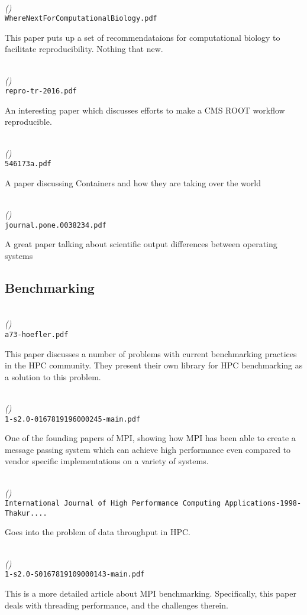 \documentclass{article}
\newenvironment{refdef}[2] {
	\noindent \textbf{\citetitle{#1}} \cite{#1}\\ \citejournalorbooktitle{#1} \textit{(\citeyear{#1})}\\ \texttt{#2} \vspace{0.2in} \par 
} {
\vspace{0.2in}
}
\begin{document}
\begin{refdef}{reproducibility-computational-biology}{WhereNextForComputationalBiology.pdf}
This paper puts up a set of recommendataions for computational biology to facilitate reproducibility. Nothing that new.
\end{refdef}

\begin{refdef}{Thain-CMS-Repro}{repro-tr-2016.pdf}
An interesting paper which discusses efforts to make a CMS ROOT workflow reproducible.
\end{refdef}

\begin{refdef}{ContainersNature}{546173a.pdf}
A paper discussing Containers and how they are taking over the world
\end{refdef}

\begin{refdef}{10.1371/journal.pone.0038234}{journal.pone.0038234.pdf}
A great paper talking about scientific output differences between operating systems
\end{refdef}

\subsection{Benchmarking}

\begin{refdef}{scientific-benchmarking-parallel-computing-1}{a73-hoefler.pdf}
This paper discusses a number of problems with current benchmarking practices in the HPC community. They present their own library for HPC benchmarking as a solution to this problem.
\end{refdef}

\begin{refdef}{gropp-mpi2}{1-s2.0-0167819196000245-main.pdf}
One of the founding papers of MPI, showing how MPI has been able to create a message passing system which can achieve high performance even compared to vendor specific implementations on a variety of systems.
\end{refdef}

\begin{refdef}{gropp-parallel-io}{International Journal of High Performance Computing Applications-1998-Thakur....}
Goes into the problem of data throughput in HPC.
\end{refdef}

\begin{refdef}{gropp-test-suite}{1-s2.0-S0167819109000143-main.pdf}
This is a more detailed article about MPI benchmarking. Specifically, this paper deals with threading performance, and the challenges therein.
\end{refdef}
\end{document}
